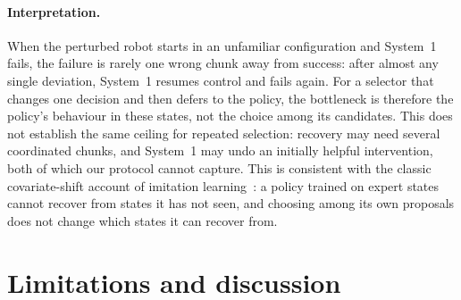\documentclass{article}
\begin{document}


\paragraph{Interpretation.} When the perturbed robot starts in an unfamiliar configuration and System~1 fails, the failure is rarely one wrong chunk away from success: after almost any single deviation, System~1 resumes control and fails again. For a selector that changes one decision and then defers to the policy, the bottleneck is therefore the policy's behaviour in these states, not the choice among its candidates. This does not establish the same ceiling for repeated selection: recovery may need several coordinated chunks, and System~1 may undo an initially helpful intervention, both of which our protocol cannot capture. This is consistent with the classic covariate-shift account of imitation learning~\citep{ross2011dagger}: a policy trained on expert states cannot recover from states it has not seen, and choosing among its own proposals does not change which states it can recover from.

\section{Limitations and discussion}
\end{document}
